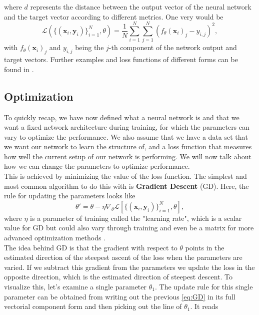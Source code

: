 where $d$ represents the distance between the output vector of the neural network and the target vector according to different metrics. One very would be 
\begin{equation}
	\mathscr{L}\left( \{(\mathbf{x}_i, \mathbf{y}_i)\}_{i=1}^{N}, \theta \right) = \frac{1}{N} \sum_{i=1}^{N} \sum_{j=1}^{N} \left(f_\theta(\mathbf{x}_i)_j - y_{i,j}\right)^2,
\end{equation}
with $f_\theta(\mathbf{x}_i)_j$ and $y_{i,j}$ being the $j$-th component of the network output and target vectors. Further examples and loss functions of different forms can be found in \cite{LossExamplePaper}.

\subsection{Optimization}\label{sec:NetworkOptimization}
To quickly recap, we have now defined what a neural network is and that we want a fixed network architecture during training, for which the parameters can vary to optimize the performance. We also assume that we have a data set that we want our network to learn the structure of, and a loss function that measures how well the current setup of our network is performing. We will now talk about how we can change the parameters to optimize performance.\\
This is achieved by minimizing the value of the loss function. The simplest and most common algorithm to do this with is \textbf{Gradient Descent} (GD). Here, the rule for updating the parameters looks like \cite{GradientDescentOverview}
\begin{equation}\label{eq:GD}
	\theta' = \theta - \eta \nabla_\theta \mathscr{L}\left[ \{(\mathbf{x}_i, \mathbf{y}_i)\}_{i=1}^{N}, \theta \right],
\end{equation}
where $\eta$ is a parameter of training called the "learning rate", which is a scalar value for GD but could also vary through training and even be a matrix for more advanced optimization methods \cite{ThePrinciplesOfDeepLearningTheory}.\\
The idea behind GD is that the gradient with respect to $\theta$ points in the estimated direction of the steepest ascent of the loss when the parameters are varied. If we subtract this gradient from the parameters we update the loss in the opposite direction, which is the estimated direction of steepest descent. To visualize this, let's examine a single parameter $\theta_1$. The update rule for this single parameter can be obtained from writing out the previous \cref{eq:GD} in its full vectorial component form and then picking out the line of $\theta_1$. It reads
